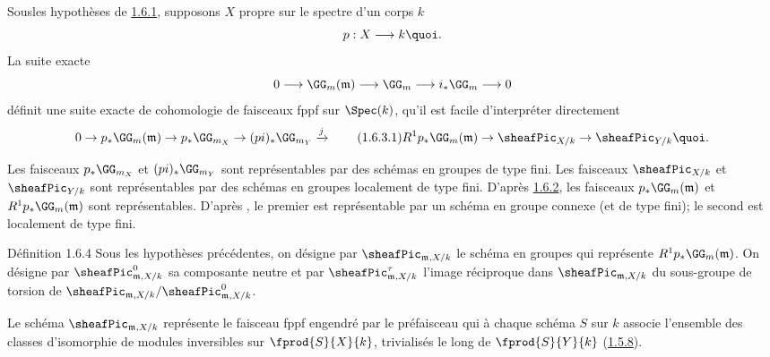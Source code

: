 \subsubsection{}
Sous\pageoriginale les hypothèses de \hyperref[XVIII.lem1.6.1]{1.6.1}, supposons
$X$ propre sur le spectre d'un corps $k$
$$
p:X\longrightarrow k{\quoi}.
$$
La suite exacte
$$
0\longrightarrow \GG_{m}(\mathfrak{m})\longrightarrow
\GG_{m}\longrightarrow i_{\ast}\GG_{m}\longrightarrow 0
$$
définit une suite exacte de cohomologie de faisceaux fppf sur $\Spec
(k)$, qu'il est facile d'interpréter directement
\begin{equation*}
 0\rightarrow p_{\ast}\GG_{m}(\mathfrak{m})\rightarrow
p_{\ast}\GG_{m_{X}}\rightarrow
(pi)_{\ast}\GG_{m_{Y}}\xrightarrow{j}\tag{1.6.3.1}
 R^{1}p_{\ast}\GG_{m}(\mathfrak{m})\rightarrow
\sheafPic_{X/k}\rightarrow \sheafPic_{Y/k}{\quoi}.
\end{equation*}

Les faisceaux $p_{\ast}\GG_{m_{X}}$ et
$(pi)_{\ast}\GG_{m_{Y}}$ sont représentables par des schémas en
groupes de type fini. Les faisceaux $\sheafPic_{X/k}$ et
$\sheafPic_{Y/k}$ sont représentables par des schémas en groupes
localement de type fini. D'après \hyperref[XVIII.subsubsec1.6.2]{1.6.2}, les faisceaux
$p_{\ast}\GG_{m}(\mathfrak{m})$ et
$R^{1}p_{\ast}\GG_{m}(\mathfrak{m})$ sont représentables. D'après
, le premier est représentable par un schéma en groupe
connexe (et de type fini); le second est localement de type fini.

\begin{enonce*}{Définition 1.6.4}
Sous les hypothèses précédentes, on désigne par
$\sheafPic_{\mathfrak{m},X/k}$ le schéma en groupes qui représente
$R^{1}p_{\ast}\GG_{m}(\mathfrak{m})$. On désigne par
$\sheafPic^{0}_{\mathfrak{m},X/k}$ sa composante neutre et par
$\sheafPic^{\tau}_{\mathfrak{m},X/k}$ l'image réciproque dans
$\sheafPic_{\mathfrak{m},X/k}$ du sous-groupe de torsion de
$\sheafPic_{\mathfrak{m},X/k}/\sheafPic^{0}_{\mathfrak{m},X/k}$.
\end{enonce*}

Le schéma $\sheafPic_{\mathfrak{m},X/k}$ représente le faisceau fppf engendré par
le préfaisceau qui à chaque schéma $S$ sur $k$ associe l'ensemble
des classes d'isomorphie de modules inversibles sur $\fprod{S}{X}{k}$,
trivialisés le long de $\fprod{S}{Y}{k}$ (\hyperref[XVIII.subsubsec1.5.8]{1.5.8}).

